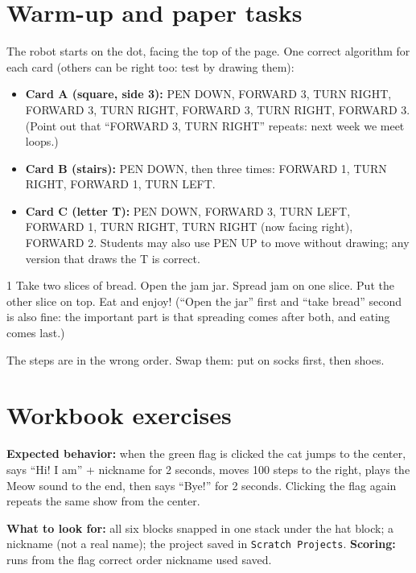 
\section{Warm-up and paper tasks}
\begin{answer}
The robot starts on the dot, facing the top of the page. One correct algorithm for each card (others can be right too: test by drawing them):
\begin{itemize}[leftmargin=1.2em,itemsep=1pt]
  \item \textbf{Card A (square, side 3):} PEN DOWN, FORWARD 3, TURN RIGHT, FORWARD 3, TURN RIGHT, FORWARD 3, TURN RIGHT, FORWARD 3. (Point out that \enquote{FORWARD 3, TURN RIGHT} repeats: next week we meet loops.)
  \item \textbf{Card B (stairs):} PEN DOWN, then three times: FORWARD 1, TURN RIGHT, FORWARD 1, TURN LEFT.
  \item \textbf{Card C (letter T):} PEN DOWN, FORWARD 3, TURN LEFT, FORWARD 1, TURN RIGHT, TURN RIGHT (now facing right), FORWARD 2. Students may also use PEN UP to move without drawing; any version that draws the T is correct.
\end{itemize}
\end{answer}

\begin{answer}
1 Take two slices of bread.  Open the jam jar.  Spread jam on one slice.  Put the other slice on top.  Eat and enjoy!
(\enquote{Open the jar} first and \enquote{take bread} second is also fine: the important part is that spreading comes after both, and eating comes last.)
\end{answer}

\begin{answer}
The steps are in the wrong order. Swap them: put on socks first, then shoes.
\end{answer}

\section{Workbook exercises}
\begin{answer}
\textbf{Expected behavior:} when the green flag is clicked the cat jumps to the center, says \enquote{Hi! I am} + nickname for 2 seconds, moves 100 steps to the right, plays the Meow sound to the end, then says \enquote{Bye!} for 2 seconds. Clicking the flag again repeats the same show from the center.

\textbf{What to look for:} all six blocks snapped in one stack under the hat block; a nickname (not a real name); the project saved in \texttt{Scratch Projects}.
\textbf{Scoring:} \tickbox{} runs from the flag \quad \tickbox{} correct order \quad \tickbox{} nickname used \quad \tickbox{} saved.
\end{answer}

